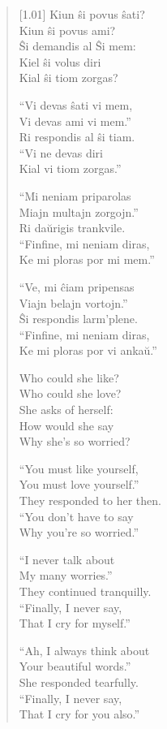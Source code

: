 \begin{verse}[1.01\textwidth]
    Kiun ŝi povus ŝati?\\
    Kiun ŝi povus ami?\\
    Ŝi demandis al Ŝi mem:\\
    Kiel ŝi volus diri\\
    Kial ŝi tiom zorgas?

    ``Vi devas ŝati vi mem,\\
    Vi devas ami vi mem.''\\
    Ri respondis al ŝi tiam.\\
    ``Vi ne devas diri\\
    Kial vi tiom zorgas.''

    ``Mi neniam priparolas\\
    Miajn multajn zorgojn.''\\
    Ri daŭrigis trankvile.\\
    ``Finfine, mi neniam diras,\\
    Ke mi ploras por mi mem.''

    ``Ve, mi ĉiam pripensas\\
    Viajn belajn vortojn.''\\
    Ŝi respondis larm'plene.\\
    ``Finfine, mi neniam diras,\\
    Ke mi ploras por vi ankaŭ.''

    \secdiv

    Who could she like?\\
    Who could she love?\\
    She asks of herself:\\
    How would she say\\
    Why she's so worried?

    ``You must like yourself,\\
    You must love yourself.''\\
    They responded to her then.\\
    ``You don't have to say\\
    Why you're so worried.''

    ``I never talk about\\
    My many worries.''\\
    They continued tranquilly.\\
    ``Finally, I never say,\\
    That I cry for myself.''

    ``Ah, I always think about\\
    Your beautiful words.''\\
    She responded tearfully.\\
    ``Finally, I never say,\\
    That I cry for you also.''
\end{verse}
